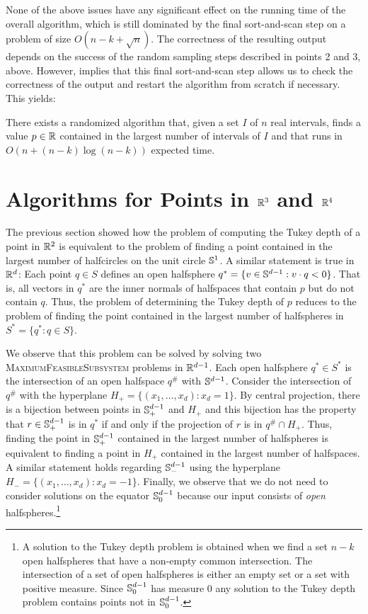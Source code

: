 \documentclass[charterfonts,lotsofwhite]{patmorin}
\begin{document}
None of the above issues have any significant effect on the running
time of the overall algorithm, which is still dominated by the final
sort-and-scan step on a problem of size $O(n-k+\sqrt{n})$.  The
correctness of the resulting output depends on the success of the
random sampling steps described in points 2 and 3, above.  However,
 implies that this final sort-and-scan step allows us
to check the correctness of the output and restart the algorithm from
scratch if necessary.  This yields:

\begin{thm}
There exists a randomized algorithm that, given a set $I$ of $n$ real
intervals, finds a value $p\in\mathbb{R}$ contained in the largest number of
intervals of $I$ and that runs in $O(n+(n-k)\log (n-k))$ expected time.
\end{thm}


\section{Algorithms for Points in $\mathbb{R}^3$ and $\mathbb{R}^4$}

The previous section showed how the problem of computing the Tukey
depth of a point in $\mathbb{R}^2$ is equivalent to the problem of finding a
point contained in the largest number of halfcircles on the unit
circle $\mathbb{S}^1$.  A similar statement is true in $\mathbb{R}^d$:  Each point
$q\in S$ defines an open halfsphere $q^*=\{ v\in\mathbb{S}^{d-1} : v\cdot q <
0\}$.  That is, all vectors in $q^*$ are the inner normals of
halfspaces that contain $p$ but do not contain $q$.  Thus, the problem
of determining the Tukey depth of $p$ reduces to the problem of
finding the point contained in the largest number of halfspheres in
$S^*=\{q^* : q\in S\}$.

We observe that this problem can be solved by solving two
\textsc{MaximumFeasibleSubsystem} problems in $\mathbb{R}^{d-1}$.  Each open
halfsphere $q^*\in S^*$ is the intersection of an open halfspace
$q^\#$ with $\mathbb{S}^{d-1}$.  Consider the intersection of $q^\#$ with the
hyperplane $H_+=\{(x_1,\ldots,x_d):x_d=1\}$.  By central projection,
there is a bijection between points in $\mathbb{S}^{d-1}_+$ and $H_+$ and
this bijection has the property that $r\in\mathbb{S}^{d-1}_+$ is in $q^*$ if
and only if the projection of $r$ is in $q^\#\cap H_+$.  Thus, finding
the point in $\mathbb{S}^{d-1}_+$ contained in the largest number of
halfspheres is equivalent to finding a point in $H_+$ contained in the
largest number of halfspaces.  A similar statement holds regarding
$\mathbb{S}^{d-1}_-$ using the hyperplane $H_-=\{(x_1,\ldots,x_d):x_d=-1\}$.
Finally, we observe that we do not need to consider solutions on the
equator $\mathbb{S}^{d-1}_0$ because our input consists of \emph{open}
halfspheres.\footnote{A solution to the Tukey depth problem is
obtained when we find a set $n-k$ open halfspheres that have a
non-empty common intersection.  The intersection of a set of open
halfspheres is either an empty set or a set with positive measure.
Since $\mathbb{S}^{d-1}_0$ has measure 0 any solution to the Tukey depth
problem contains points not in $\mathbb{S}^{d-1}_0$.}
\end{document}
